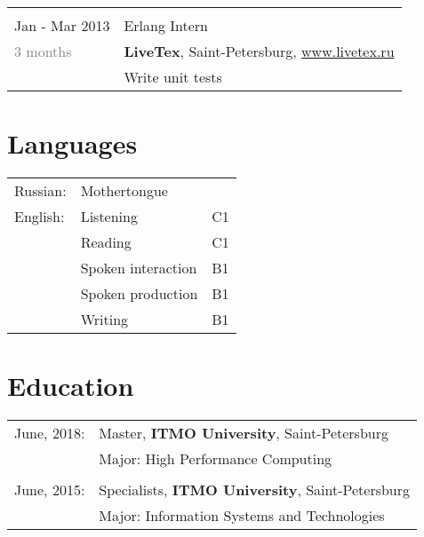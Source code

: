 \documentclass[a4paper,10pt]{article}
\begin{document}
\begin{tabularx}{\textwidth}{lX}
	\multicolumn{2}{c}{}\\

	Jan - Mar 2013			&	Erlang Intern \\
	\textcolor{gray}
	{3 months}
							&	\textbf{LiveTex}, Saint-Petersburg,
								\href{www.livetex.ru}{www.livetex.ru} \\
							& 	\footnotesize{Write unit tests} \\
\end{tabularx}


\section{Languages}
\begin{tabular}{ll|l}
	Russian:				& \multicolumn{2}{l}{Mothertongue} \\
	English\footnotemark :	& Listening				& C1 \\
							& Reading				& C1 \\
							& Spoken interaction	& B1 \\
							& Spoken production		& B1 \\
							& Writing				& B1 \\
	
\end{tabular}


\section{Education}
\begin{tabularx}{\textwidth}{lX}
	June, 2018:		& Master, \textbf{ITMO University}, Saint-Petersburg \\
					& Major:  High Performance Computing \\

	\multicolumn{2}{c}{}\\

	June, 2015:		& Specialists, \textbf{ITMO University}, Saint-Petersburg \\
					& Major:  Information Systems and Technologies
\end{tabularx}


\end{document}
